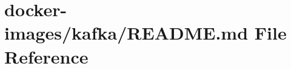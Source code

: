 \hypertarget{docker-images_2kafka_2_r_e_a_d_m_e_8md}{}\section{docker-\/images/kafka/\+R\+E\+A\+D\+ME.md File Reference}
\label{docker-images_2kafka_2_r_e_a_d_m_e_8md}
